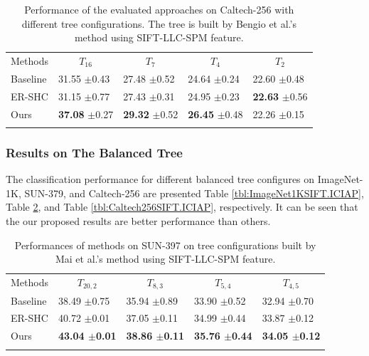 \documentclass[review]{elsarticle}
\begin{document}
\begin{table}
\caption{Performance of the evaluated approaches on Caltech-256 with different tree configurations. The tree is built by Bengio et al.'s method \cite{Bengio.NIPS2010} using SIFT-LLC-SPM feature.}  
\label{tbl:Caltech256SIFT} 
\centering
\begin{tabular}{lllll}
\hline\noalign{\smallskip}
Methods  & \multicolumn{1}{c}{$T_{16}$} & \multicolumn{1}{c}{$T_{7}$} & \multicolumn{1}{c}{$T_{4}$} &		\multicolumn{1}{c}{$T_{2}$}  \\
\noalign{\smallskip}\hline\hline\noalign{\smallskip}
Baseline 	 				& 31.55 $\pm$0.43 & 27.48 $\pm$0.52 & 24.64 $\pm$0.24 & 22.60 $\pm$0.48 \\
ER-SHC \cite{Zhu.CVIU2014} 	& 31.15 $\pm$0.77 & 27.43 $\pm$0.31 & 24.95 $\pm$0.23 & \textbf{22.63} $\pm$0.56 \\

Ours             &  \textbf{37.08} $\pm$0.27 & \textbf{29.32} $\pm$0.52 & \textbf{26.45} $\pm$0.48 & 22.26 $\pm$0.15 \\
\noalign{\smallskip}\hline\noalign{\smallskip}
\end{tabular}
\end{table}

\subsubsection{Results on The Balanced Tree}
The classification performance for different balanced tree configures on ImageNet-1K, SUN-379, and Caltech-256 are presented Table \ref{tbl:ImageNet1KSIFT.ICIAP}, Table \ref{tbl:SUN397SIFT.ICIAP}, and Table \ref{tbl:Caltech256SIFT.ICIAP}, respectively. 
It can be seen that the our proposed results are better performance than others.
 
\begin{table}
\caption{Performances of methods on SUN-397 on tree configurations built by Mai et al.'s method \cite{MaiICIAP15} using SIFT-LLC-SPM feature.}  
\label{tbl:SUN397SIFT.ICIAP}
\centering
\begin{tabular}{lllll}
\hline\noalign{\smallskip}
Methods  & \multicolumn{1}{c}{$T_{20,2}$} & \multicolumn{1}{c}{$T_{8,3}$} & \multicolumn{1}{c}{$T_{5,4}$} &		\multicolumn{1}{c}{$T_{4,5}$} \\
\noalign{\smallskip}\hline\hline\noalign{\smallskip}
Baseline \cite{MaiICIAP15} 	&  38.49 $\pm$0.75  & 35.94 $\pm$0.89 & 33.90 $\pm$0.52 & 32.94 $\pm$0.70 \\
ER-SHC \cite{Zhu.CVIU2014} 	&  40.72 $\pm$0.01  & 37.05 $\pm$0.11 & 34.99 $\pm$0.44 & 33.87 $\pm$0.12 \\
Ours             &    \textbf{43.04 $\pm$0.01} & \textbf{38.86 $\pm$0.11} & \textbf{35.76 $\pm$0.44} & \textbf{34.05 $\pm$0.12} \\
\noalign{\smallskip}\hline\noalign{\smallskip}

\end{tabular}
\end{table}
\end{document}
